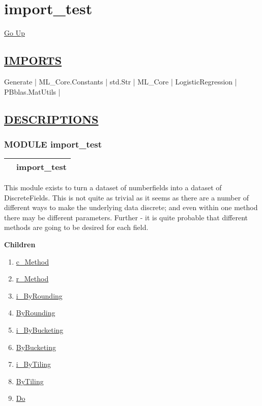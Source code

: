 \chapter*{\color{headfile}
import_test
}
\hypertarget{ecldoc:toc:import_test}{}
\hyperlink{ecldoc:toc:root}{Go Up}

\section*{\underline{\textsf{IMPORTS}}}
\begin{doublespace}
{\large
Generate |
ML\_Core.Constants |
std.Str |
ML\_Core |
LogisticRegression |
PBblas.MatUtils |
}
\end{doublespace}

\section*{\underline{\textsf{DESCRIPTIONS}}}
\subsection*{\textsf{\colorbox{headtoc}{\color{white} MODULE}
import\_test}}

\hypertarget{ecldoc:ML_Core.Discretize}{}

{\renewcommand{\arraystretch}{1.5}
\begin{tabularx}{\textwidth}{|>{\raggedright\arraybackslash}l|X|}
\hline
\hspace{0pt}\mytexttt{\color{red} } & \textbf{import\_test} \\
\hline
\end{tabularx}
}

\par
This module exists to turn a dataset of numberfields into a dataset of DiscreteFields. This is not quite as trivial as it seems as there are a number of different ways to make the underlying data discrete; and even within one method there may be different parameters. Further - it is quite probable that different methods are going to be desired for each field.


\textbf{Children}
\begin{enumerate}
\item \hyperlink{ecldoc:ecldoc-c_Method}{c\_Method}
\item \hyperlink{ecldoc:ml_core.discretize.r_method}{r\_Method}
\item \hyperlink{ecldoc:ml_core.discretize.i_byrounding}{i\_ByRounding}
\item \hyperlink{ecldoc:ml_core.discretize.byrounding}{ByRounding}
\item \hyperlink{ecldoc:ml_core.discretize.i_bybucketing}{i\_ByBucketing}
\item \hyperlink{ecldoc:ml_core.discretize.bybucketing}{ByBucketing}
\item \hyperlink{ecldoc:ml_core.discretize.i_bytiling}{i\_ByTiling}
\item \hyperlink{ecldoc:ml_core.discretize.bytiling}{ByTiling}
\item \hyperlink{ecldoc:ml_core.discretize.do}{Do}
\end{enumerate}

